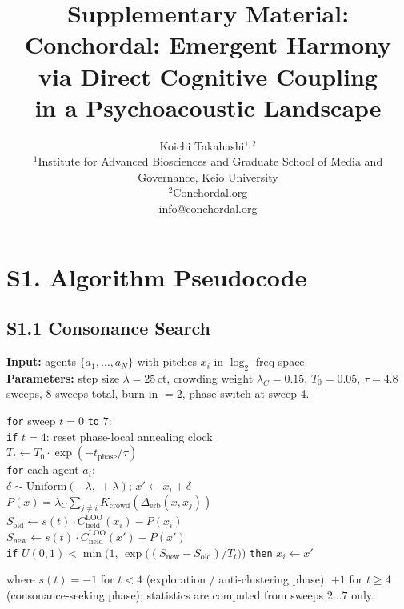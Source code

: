 \documentclass[letterpaper]{article}
\title{Supplementary Material:\\Conchordal: Emergent Harmony via Direct Cognitive Coupling\\in a Psychoacoustic Landscape}
\author{
    Koichi Takahashi$^{1,2}$
    \mbox{}\\
    $^1$Institute for Advanced Biosciences and Graduate School of Media and Governance, Keio University \\
    $^2$Conchordal.org \\
    info@conchordal.org
}
\begin{document}
\maketitle

\section{S1. Algorithm Pseudocode}

\subsection{S1.1 Consonance Search}

\noindent\textbf{Input:} agents $\{a_1,\ldots,a_N\}$ with pitches $x_i$ in $\log_2$-freq space.\\
\textbf{Parameters:} step size $\lambda\!=\!25$\,ct, crowding weight $\lambda_C\!=\!0.15$, $T_0\!=\!0.05$, $\tau\!=\!4.8$ sweeps, 8 sweeps total, burn-in $=2$, phase switch at sweep 4.

\smallskip
\noindent\texttt{for} sweep $t = 0$ \texttt{to} $7$:\\
\hspace*{1em}\texttt{if} $t = 4$: reset phase-local annealing clock\\
\hspace*{1em}$T_t \gets T_0 \cdot \exp(-t_{\text{phase}}/\tau)$\\
\hspace*{1em}\texttt{for} each agent $a_i$:\\
\hspace*{2em}$\delta \sim \mathrm{Uniform}(-\lambda,\,+\lambda)$; \quad $x' \gets x_i + \delta$\\
\hspace*{2em}$P(x) = \lambda_C \sum_{j \neq i} K_{\text{crowd}}(\Delta_{\text{erb}}(x,x_j))$\\
\hspace*{2em}$S_{\text{old}} \gets s(t) \cdot C^{\text{LOO}}_{\text{field}}(x_i) - P(x_i)$\\
\hspace*{2em}$S_{\text{new}} \gets s(t) \cdot C^{\text{LOO}}_{\text{field}}(x') - P(x')$\\
\hspace*{2em}\texttt{if} $U(0,1) < \min\!\bigl(1,\,\exp\bigl((S_{\text{new}} - S_{\text{old}})/T_t\bigr)\bigr)$ \texttt{then} $x_i \gets x'$

\smallskip
\noindent where $s(t) = -1$ for $t < 4$ (exploration / anti-clustering phase), $+1$ for $t \geq 4$ (consonance-seeking phase); statistics are computed from sweeps $2\ldots7$ only.
\end{document}
